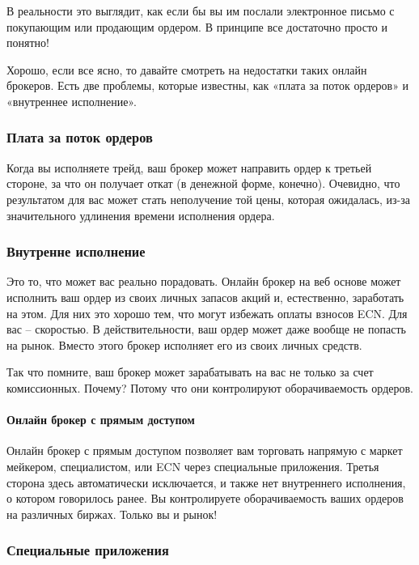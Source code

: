 \documentclass{book}
\begin{document}
В реальности это выглядит, как если бы вы им послали электронное письмо с покупающим или продающим ордером. В принципе все достаточно просто и понятно!

Хорошо, если все ясно, то давайте смотреть на недостатки таких онлайн
брокеров. Есть две проблемы, которые известны, как «плата за поток
ордеров» и «внутреннее исполнение».

\subsubsection{Плата за поток ордеров}

Когда вы исполняете трейд, ваш брокер может направить ордер к третьей
стороне, за что он получает откат (в денежной форме,
конечно). Очевидно, что результатом для вас может стать неполучение
той цены, которая ожидалась, из-за значительного удлинения времени
исполнения ордера.

\subsubsection{Внутренне исполнение}

Это то, что может вас реально порадовать. Онлайн брокер на веб основе может исполнить ваш ордер из своих личных запасов акций и, естественно, заработать на этом. Для них это хорошо тем, что могут избежать оплаты взносов ECN. Для вас – скоростью. В действительности, ваш ордер может даже вообще не попасть на рынок. Вместо этого брокер исполняет его из своих личных средств.

Так что помните, ваш брокер может зарабатывать на вас не только за
счет комиссионных. Почему? Потому что они контролируют оборачиваемость
ордеров.

\paragraph{Онлайн брокер с прямым доступом}

Онлайн брокер с прямым доступом позволяет вам торговать напрямую с
маркет мейкером, специалистом, или ECN через специальные
приложения. Третья сторона здесь автоматически исключается, и также
нет внутреннего исполнения, о котором говорилось ранее. Вы
контролируете оборачиваемость ваших ордеров на различных
биржах. Только вы и рынок!

\subsubsection{Специальные приложения}
\end{document}
